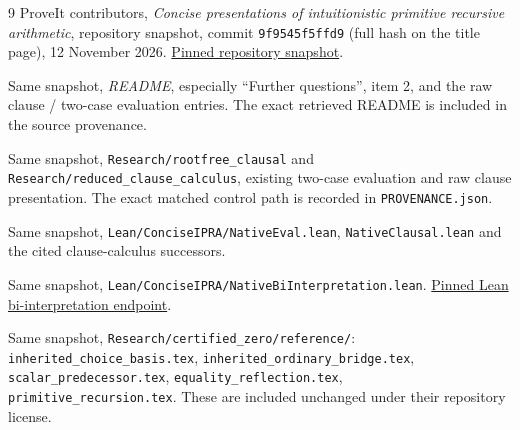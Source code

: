 \documentclass[11pt,letterpaper]{article}
\theoremstyle{definition}
\theoremstyle{remark}
\begin{document}
\begin{thebibliography}{9}
 ProveIt contributors, \emph{Concise presentations of
intuitionistic primitive recursive arithmetic}, repository snapshot,
commit \texttt{9f9545f5ffd9} (full hash on the title page),
12 November 2026.
\href{https://github.com/VladimirReshetnikov/ProveIt/tree/9f9545f5ffd9e0392d4a36639503aca12383450a/Logic/PrimitiveRecursiveArithmetic/ConciseIPRA}{Pinned repository snapshot}.

 Same snapshot, \emph{README}, especially ``Further
questions'', item 2, and the raw clause / two-case evaluation entries.
The exact retrieved README is included in the source provenance.

 Same snapshot,
\texttt{Research/rootfree\_clausal} and
\texttt{Research/reduced\_clause\_calculus}, existing two-case evaluation
and raw clause presentation. The exact matched control path is recorded
in \texttt{PROVENANCE.json}.

 Same snapshot,
\texttt{Lean/ConciseIPRA/NativeEval.lean},
\texttt{NativeClausal.lean} and the cited clause-calculus successors.

 Same snapshot,
\texttt{Lean/ConciseIPRA/NativeBiInterpretation.lean}.
\href{https://github.com/VladimirReshetnikov/ProveIt/blob/9f9545f5ffd9e0392d4a36639503aca12383450a/Logic/PrimitiveRecursiveArithmetic/ConciseIPRA/Lean/ConciseIPRA/NativeBiInterpretation.lean}{Pinned Lean bi-interpretation endpoint}.

 Same snapshot,
\texttt{Research/certified\_zero/reference/}:
\texttt{inherited\_choice\_basis.tex},
\texttt{inherited\_ordinary\_bridge.tex},
\texttt{scalar\_predecessor.tex},
\texttt{equality\_reflection.tex},
\texttt{primitive\_recursion.tex}.
These are included unchanged under their repository license.
\end{thebibliography}
\end{document}
